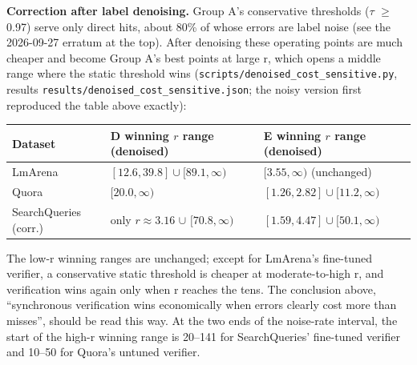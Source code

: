 \documentclass[11pt]{article}
\newenvironment{fittab}{\begin{lrbox}{\fittabbox}}{\end{lrbox}%
  \ifdim\wd\fittabbox>\linewidth\resizebox{\linewidth}{!}{\usebox{\fittabbox}}\else\usebox{\fittabbox}\fi}
\begin{document}
\textbf{Correction after label denoising.} Group A's conservative thresholds ($\tau$ $\geq$ 0.97) serve only direct hits, about 80\% of whose errors are label noise (see the 2026-09-27 erratum at the top). After denoising these operating points are much cheaper and become Group A's best points at large r, which opens a middle range where the static threshold wins (\texttt{scripts/\allowbreak{}denoised\_\allowbreak{}cost\_\allowbreak{}sensitive.\allowbreak{}py}, results \texttt{results/\allowbreak{}denoised\_\allowbreak{}cost\_\allowbreak{}sensitive.\allowbreak{}json}; the noisy version first reproduced the table above exactly):

\begin{center}
\small
\begin{fittab}\begin{tabular}{@{}lll@{}}
\toprule
\textbf{Dataset} & \textbf{D winning $r$ range (denoised)} & \textbf{E winning $r$ range (denoised)} \\
\midrule
LmArena & $[12.6, 39.8] \cup [89.1, \infty)$ & $[3.55, \infty)$ (unchanged) \\
Quora & $[20.0, \infty)$ & $[1.26, 2.82] \cup [11.2, \infty)$ \\
SearchQueries (corr.) & only $r\approx 3.16$ $\cup$ $[70.8, \infty)$ & $[1.59, 4.47] \cup [50.1, \infty)$ \\
\bottomrule
\end{tabular}\end{fittab}
\end{center}

The low-r winning ranges are unchanged; except for LmArena's fine-tuned verifier, a conservative static threshold is cheaper at moderate-to-high r, and verification wins again only when r reaches the tens. The conclusion above, ``synchronous verification wins economically when errors clearly cost more than misses'', should be read this way. At the two ends of the noise-rate interval, the start of the high-r winning range is 20–141 for SearchQueries' fine-tuned verifier and 10–50 for Quora's untuned verifier.
\end{document}
